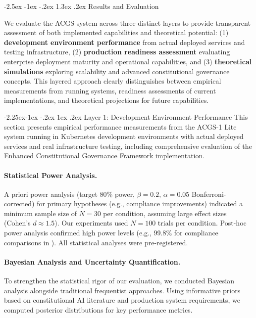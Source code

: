 \documentclass[manuscript,screen,9pt]{acmart}
\makeatletter
\renewcommand\section{\@startsection{section}{1}{\z@}%
  {-2.5ex \@plus -1ex \@minus -.2ex}%
  {1.3ex \@plus.2ex}%
  {\normalfont\Large\bfseries}}
\renewcommand\subsection{\@startsection{subsection}{2}{\z@}%
  {-2.25ex\@plus -1ex \@minus -.2ex}%
  {1ex \@plus .2ex}%
  {\normalfont\large\bfseries}}
\makeatother
\begin{document}
\section{Results and Evaluation}
\label{sec:results}

We evaluate the ACGS system across three distinct layers to provide transparent assessment of both implemented capabilities and theoretical potential: (1) \textbf{development environment performance} from actual deployed services and testing infrastructure, (2) \textbf{production readiness assessment} evaluating enterprise deployment maturity and operational capabilities, and (3) \textbf{theoretical simulations} exploring scalability and advanced constitutional governance concepts. This layered approach clearly distinguishes between empirical measurements from running systems, readiness assessments of current implementations, and theoretical projections for future capabilities.

\subsection{Layer 1: Development Environment Performance}
\label{subsec:development_performance}
This section presents empirical performance measurements from the ACGS-1 Lite system running in Kubernetes development environments with actual deployed services and real infrastructure testing, including comprehensive evaluation of the Enhanced Constitutional Governance Framework implementation.

\paragraph{Statistical Power Analysis.}
\label{subsec:power_analysis}
A priori power analysis (target 80\% power, $\beta = 0.2$, $\alpha = 0.05$ Bonferroni-corrected) for primary hypotheses (e.g., compliance improvements) indicated a minimum sample size of $N=30$ per condition, assuming large effect sizes (Cohen's $d \approx 1.5$). Our experiments used $N=100$ trials per condition. Post-hoc power analysis confirmed high power levels (e.g., 99.8\% for compliance comparisons in ). All statistical analyses were pre-registered.

\paragraph{Bayesian Analysis and Uncertainty Quantification.}
\label{subsec:bayesian_analysis}
To strengthen the statistical rigor of our evaluation, we conducted Bayesian analysis alongside traditional frequentist approaches. Using informative priors based on constitutional AI literature and production system requirements, we computed posterior distributions for key performance metrics.
\end{document}
